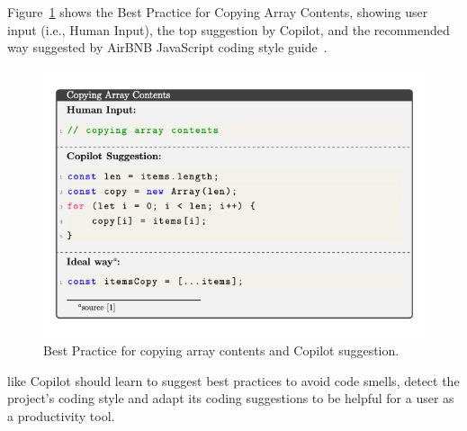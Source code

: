 Figure~\ref{fig:bp_1} shows the Best Practice for Copying Array Contents, showing user input (i.e., Human Input), the top suggestion by Copilot, and the recommended way suggested by AirBNB JavaScript coding style guide~\cite{airbnb_code}.

\begin{figure}[hbt!]
    \centering
    \includegraphics[width=\linewidth]{Figures/bp_1.png}
    \caption{Best Practice for copying array contents and Copilot suggestion.}
    \label{fig:bp_1}
\end{figure}

\cct{} like Copilot should learn to suggest best practices to avoid code smells, detect the project's coding style and adapt its coding suggestions to be helpful for a user as a productivity tool. 


